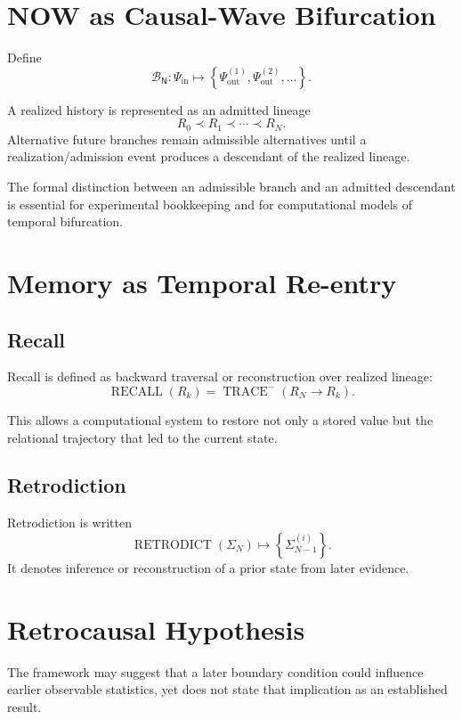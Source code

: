 \documentclass[11pt,a4paper]{book}
\newcommand{\Now}{\mathsf{N}}
\newcommand{\BN}{\mathcal B_{\Now}}
\begin{document}
\chapter{NOW as Causal-Wave Bifurcation}
Define
\begin{equation}
\BN:
\Psi_{\mathrm{in}}
\mapsto
\left\{
\Psi_{\mathrm{out}}^{(1)},
\Psi_{\mathrm{out}}^{(2)},
\ldots
\right\}.
\end{equation}

A realized history is represented as an admitted lineage
\begin{equation}
R_0\prec R_1\prec\cdots\prec R_N.
\end{equation}
Alternative future branches remain admissible alternatives until a realization/admission event produces a descendant of the realized lineage.

The formal distinction between an admissible branch and an admitted descendant is essential for experimental bookkeeping and for computational models of temporal bifurcation.

\chapter{Memory as Temporal Re-entry}
\section{Recall}
Recall is defined as backward traversal or reconstruction over realized lineage:
\begin{equation}
\operatorname{RECALL}(R_k)
=
\operatorname{TRACE}^{-}(R_N\rightarrow R_k).
\end{equation}

This allows a computational system to restore not only a stored value but the relational trajectory that led to the current state.

\section{Retrodiction}
Retrodiction is written
\begin{equation}
\operatorname{RETRODICT}(\Sigma_N)
\mapsto
\left\{
\Sigma_{N-1}^{(i)}
\right\}.
\end{equation}
It denotes inference or reconstruction of a prior state from later evidence.

\chapter{Retrocausal Hypothesis}
The framework may suggest that a later boundary condition could influence earlier observable statistics, yet does not state that implication as an established result.
\end{document}
